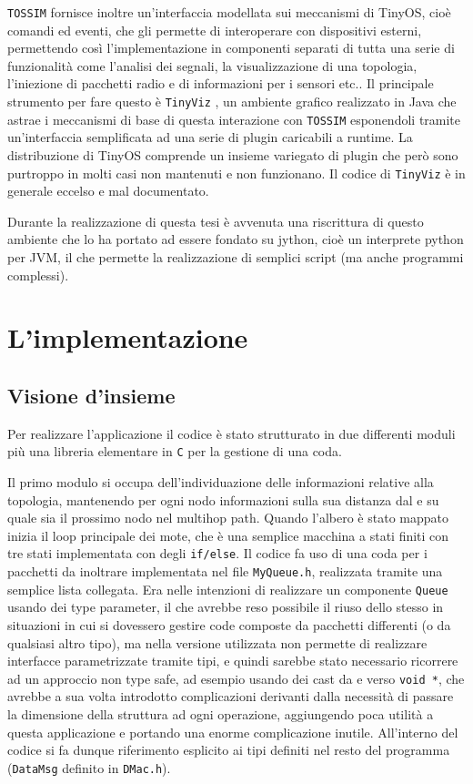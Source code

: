 \documentclass[twoside,11pt,a4paper,italian,openany]{book}
\newcommand{\tv}{\texttt{TinyViz} }
\newcommand{\tos}{\texttt{TOSSIM} }
\begin{document}
\tos fornisce inoltre un'interfaccia modellata sui meccanismi di TinyOS, cioè comandi ed eventi, 
che gli permette di interoperare con dispositivi esterni, permettendo così l'implementazione 
in componenti separati di tutta una serie di funzionalità come l'analisi dei segnali, 
la visualizzazione di una topologia, l'iniezione di pacchetti radio e di informazioni per 
i sensori etc.. 
Il principale strumento per fare questo è \tv, un ambiente grafico realizzato in Java che 
astrae i meccanismi di base di questa 
interazione con \tos esponendoli tramite un'interfaccia semplificata ad una serie 
di plugin caricabili a runtime.  
La distribuzione di TinyOS comprende un insieme variegato di plugin che 
però sono purtroppo in molti casi non mantenuti e non funzionano. Il codice di \tv è 
in generale eccelso e mal documentato. 

Durante la realizzazione di questa tesi è avvenuta una riscrittura di 
questo ambiente che lo ha portato ad essere fondato su jython\cite{tython}, 
cioè un interprete python per JVM, il che permette la realizzazione di semplici script 
(ma anche programmi complessi).  
 

\chapter{L'implementazione}
\section{Visione d'insieme}
Per realizzare l'applicazione il codice è stato strutturato in due differenti moduli più 
una libreria elementare in \texttt{C} per la gestione di una coda.

Il primo modulo si occupa dell'individuazione delle informazioni relative alla topologia, 
mantenendo per ogni nodo informazioni sulla sua distanza dal \sink e su quale sia il prossimo 
nodo nel multihop path.  
Quando l'albero è stato mappato inizia il loop principale dei mote, che è una 
semplice macchina a stati finiti con tre stati implementata con degli \texttt{if/else}.
Il codice fa uso di una coda per i pacchetti da inoltrare implementata nel file \texttt{MyQueue.h}, realizzata tramite una semplice lista collegata.
Era nelle intenzioni di realizzare un componente \texttt{Queue} usando dei type parameter, 
il che avrebbe reso possibile il riuso dello stesso in situazioni in cui si dovessero gestire 
code composte da pacchetti differenti (o da qualsiasi altro tipo), ma \nesc nella versione 
utilizzata non permette di 
realizzare interfacce parametrizzate tramite tipi, e quindi sarebbe stato necessario ricorrere 
ad un approccio non type safe, ad esempio usando dei cast da e verso \texttt{void *}, che  
avrebbe a sua volta introdotto complicazioni derivanti dalla necessità di passare la dimensione 
della struttura ad ogni operazione, aggiungendo poca utilità a questa applicazione e portando  
una enorme complicazione inutile.
All'interno del codice si fa dunque riferimento esplicito ai tipi 
definiti nel resto del programma (\texttt{DataMsg} definito in \texttt{DMac.h}).
\end{document}
